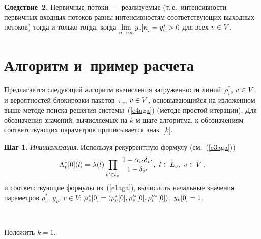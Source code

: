 \begin{multicols}{2}
     \smallskip
     
     \noindent
     \textbf{Следствие~2.} Первичные потоки~--- реали\-зу\-емые (т.\,е.\ 
интенсивности первичных входных потоков равны интенсивностям 
соответствующих выходных потоков) тогда и только тогда, когда 
$\lim\limits_{n\rightarrow\infty} y_v[n]\hm=y_v^*\hm>0$ для всех $v\hm\in V$. 
     
\section{Алгоритм и~пример расчета}
     
     Предлагается следующий алгоритм вычисления загруженности 
линий~$\overline{\rho}_v^*$, $v\hm\in V$, и вероятностей блокировки 
пакетов~$\pi_v$, $v\hm\in V$, основывающийся на изложенном выше методе 
поиска решения системы~(\ref{e4aga}) (методе простой итерации). Для 
обозначения значений, вычисляемых на $k$-м шаге алгоритма, к 
обозначениям соответствующих параметров приписывается знак~[$k$]. 
     
     \textbf{Шаг 1.} \textit{Инициализация}. Используя рекуррентную 
формулу (см.~(\ref{e3aga})) 
$$
\Lambda^*_v[0](l)\hm=\lambda(l)\prod\limits_{v^\prime\in l_v^+} \fr{1-
\alpha_{ v^\prime }\delta_{ v^\prime }}{1-\delta_{v^\prime}},\ l\in L_v, \
v\hm\in V\,,
$$
и соответствующие формулы из~(\ref{e1aga}), вычислить 
начальные значения параметров $\overline{\rho}_v^*$, $y_v$, $v\in V$: 
$\overline{\rho}_v^*[0]\hm= \left(\rho_v^* [0], \rho_v^{\prime *}[0], 
\rho_v^{\prime\prime *}[0]\right)$, $y_v[0]\hm=1$.

\begin{figure*} %
\vspace*{1pt}
 \begin{center}
 \mbox{%
 \epsfxsize=148.986mm
 }
 \end{center}
 \vspace*{-9pt}
\vspace*{12pt}
\end{figure*}
     
     Положить $k=1$.
     
     \pagebreak
     


\end{multicols}
